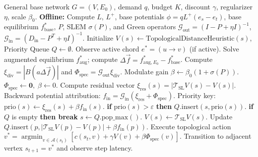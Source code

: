 \documentclass[11pt,a4paper]{article}
\begin{document}
\begin{algorithm}[t]
\caption{Spectral-Laplacian Prioritized Sweeping (SL-PS)}
\label{alg:sl_ps}
\begin{algorithmic}[1]
\REQUIRE General base network $G = (V, E_0)$, demand $q$, budget $K$, discount $\gamma$, regularizer $\eta$, scale $\beta_0$.
\STATE \textbf{Offline:} Compute $L$, $L^+$, base potentials $\phi = q L^+ (e_s - e_t)$, base equilibrium $f_{\text{base}}^*$, $P$, SLEM $\sigma(P)$, and Green operators $\mathcal{G}_{\text{out}} = (I - P + \eta I)^{-1}$, $\mathcal{G}_{\text{in}} = (D_{\text{in}} - P^T + \eta I)^{-1}$.
\STATE Initialize $V(s) \leftarrow \text{TopologicalDistanceHeuristic}(s)$, Priority Queue $Q \leftarrow \emptyset$.
    \STATE Observe active chord $e^* = (u \to v)$ (if active).
        \STATE Solve augmented equilibrium $f_{\text{aug}}^*$; compute $\Delta \vec{f} = f_{\text{aug}, E_0}^* - f_{\text{base}}^*$.
        \STATE Compute $\xi_{\text{div}} = |B (a \Delta \vec{f})|$ and $\Phi_{\text{spec}} = \mathcal{G}_{\text{out}} \xi_{\text{div}}$.
        \STATE Modulate gain $\beta \leftarrow \beta_0 (1 + \sigma(P))$.
    \ELSE
        \STATE $\Phi_{\text{spec}} \leftarrow \mathbf{0}, \; \beta \leftarrow 0$.
    \ENDIF
    \STATE Compute residual vector $\xi_{\text{res}}(s) = |\mathcal{T}_{\text{SL}} V(s) - V(s)|$.
    \STATE Backward potential attribution: $f_{\text{in}} = \mathcal{G}_{\text{in}} (\xi_{\text{res}} + \Phi_{\text{spec}})$.
        \STATE Priority key: $\text{prio}(s) \leftarrow \xi_{\text{res}}(s) + \beta f_{\text{in}}(s)$.
        \STATE \textbf{if} $\text{prio}(s) > \varepsilon$ \textbf{then} $Q.\text{insert}(s, \text{prio}(s))$.
    \ENDFOR
        \STATE \textbf{if} $Q$ is empty \textbf{then break}
        \STATE $s \leftarrow Q.\text{pop\_max}()$.
        \STATE $V(s) \leftarrow \mathcal{T}_{\text{SL}} V(s)$.
            \STATE Update $Q.\text{insert}(p, |\mathcal{T}_{\text{SL}} V(p) - V(p)| + \beta f_{\text{in}}(p))$.
        \ENDFOR
    \ENDFOR
    \STATE Execute topological action $v^* = \operatorname{argmin}_{v \in \mathcal{A}(s_t)} [ c(s_t, v) + \gamma V(v) + \beta \Phi_{\text{spec}}(v) ]$.
    \STATE Transition to adjacent vertex $s_{t+1} = v^*$ and observe step latency.
\ENDFOR
\end{algorithmic}
\end{algorithm}
\end{document}
